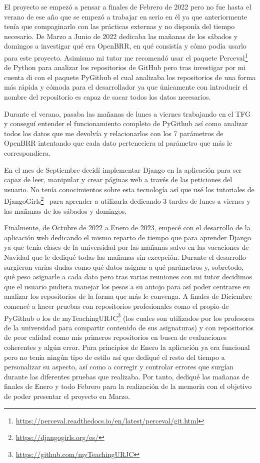 \documentclass[a4paper, 12pt]{book}
\begin{document}
El proyecto se empezó a pensar a finales de Febrero de 2022 pero no fue hasta el verano de ese año que se empezó a trabajar en serio en él ya que anteriormente tenía que compaginarlo con las prácticas externas y no disponía del tiempo necesario. 
De Marzo a Junio de 2022 dedicaba las mañanas de los sábados y domingos a investigar qué era OpenBRR, en qué consistía y cómo podía usarlo para este proyecto. Asimismo mi tutor me recomendó usar el paquete Perceval\footnote{\url{https://perceval.readthedocs.io/en/latest/perceval/git.html}} de Python para analizar los repositorios de GitHub pero tras investigar por mi cuenta di con el paquete PyGithub el cual analizaba los repositorios de una forma más rápida y cómoda para el desarrollador ya que únicamente con introducir el nombre del repositorio es capaz de sacar todos los datos necesarios.

Durante el verano, pasaba las mañanas de lunes a viernes trabajando en el TFG y conseguí entender el funcionamiento completo de PyGithub así como analizar todos los datos que me devolvía y relacionarlos con los 7 parámetros de OpenBRR intentando que cada dato perteneciera al parámetro que más le correspondiera.

En el mes de Septiembre decidí implementar Django en la aplicación para ser capaz de leer, manipular y crear páginas web a través de las peticiones del usuario. No tenía conocimientos sobre esta tecnología así que usé los tutoriales de DjangoGirls\footnote{\url{https://djangogirls.org/es/}}~\cite{website:DjangoGirls} para aprender a utilizarla dedicando 3 tardes de lunes a viernes y las mañanas de los sábados y domingos.

Finalmente, de Octubre de 2022 a Enero de 2023, empecé con el desarrollo de la aplicación web dedicando el mismo reparto de tiempo que para aprender Django ya que tenía clases de la universidad por las mañanas salvo en las vacaciones de Navidad que le dediqué todas las mañanas sin excepción. Durante el desarrollo surgieron varias dudas como qué datos asignar a qué parámetros y, sobretodo, qué peso asignarle a cada dato pero tras varias reuniones con mi tutor decidimos que el usuario pudiera manejar los pesos a su antojo para así poder centrarse en analizar los repositorios de la forma que más le convenga.
A finales de Diciembre comencé a hacer pruebas con repositorios profesionales como el propio de PyGithub o los de myTeachingURJC\footnote{\url{https://github.com/myTeachingURJC}} (los cuales son utilizados por los profesores de la universidad para compartir contenido de sus asignaturas) y con repositorios de peor calidad como mis primeros repositorios en busca de evaluaciones coherentes y algún error. Para principios de Enero la aplicación ya era funcional pero no tenía ningún tipo de estilo así que dediqué el resto del tiempo a personalizar su aspecto, así como a corregir y controlar errores que surgían durante las diferentes pruebas que realizaba.
Por tanto, dediqué las mañanas de finales de Enero y todo Febrero para la realización de la memoria con el objetivo de poder presentar el proyecto en Marzo.
\end{document}
